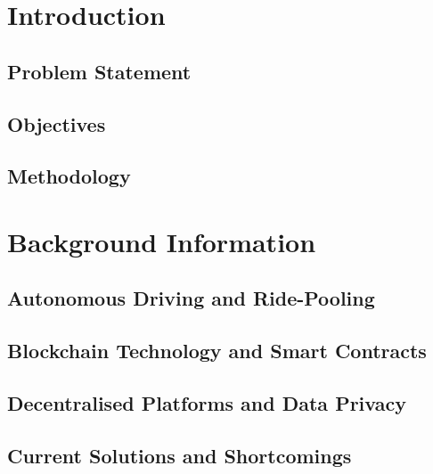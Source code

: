 \documentclass[
  a4paper,  %
  twoside,  %
  bibliography=totoc,
  headsepline,
  cleardoublepage=empty,
  parskip=half,
  draft=false
]{scrbook}
\begin{document}
%
%


\chapter{Introduction}

\section{Problem Statement}

\section{Objectives}\label{sec:objectives}

\section{Methodology}


\chapter{Background Information}

\section{Autonomous Driving and Ride-Pooling}

\section{Blockchain Technology and Smart Contracts}

\section{Decentralised Platforms and Data Privacy}

\section{Current Solutions and Shortcomings}

\end{document}
